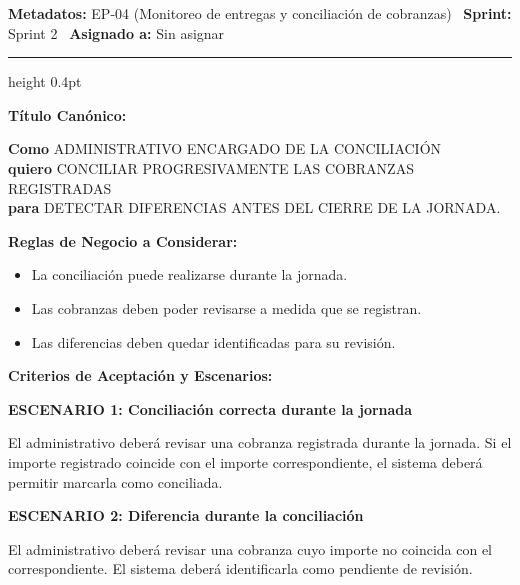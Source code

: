 \documentclass[a4paper,9pt]{article}
\begin{document}
\begin{tcolorbox}[hucard, title={\textbf{HU-20: CONCILIAR COBRANZAS DURANTE LA JORNADA} \hfill \scriptsize \colorbox{redstatus}{\textbf{\ Rejected\ }} \quad \colorbox{white}{\textcolor{primarydark}{\textbf{\ 3 pts\ }}}}]
\vspace{-1pt}
\noindent\textbf{\footnotesize Metadatos:} EP-04 (Monitoreo de entregas y conciliación de cobranzas) \textbar\ \textbf{Sprint:} Sprint 2 \textbar\ \textbf{Asignado a:} Sin asignar\par\vspace{2pt}
\hrule height 0.4pt\par\vspace{3pt}
\noindent\textbf{\footnotesize Título Canónico:}\par\vspace{1pt}
{\small \textbf{Como} ADMINISTRATIVO ENCARGADO DE LA CONCILIACIÓN \\ \textbf{quiero} CONCILIAR PROGRESIVAMENTE LAS COBRANZAS REGISTRADAS \\ \textbf{para} DETECTAR DIFERENCIAS ANTES DEL CIERRE DE LA JORNADA.}\par\vspace{3pt}
\noindent\textbf{\footnotesize Reglas de Negocio a Considerar:}\par\vspace{1pt}
{\footnotesize
\begin{itemize}[leftmargin=12pt, nosep, itemsep=1.5pt, topsep=1pt]
\item La conciliación puede realizarse durante la jornada.
\item Las cobranzas deben poder revisarse a medida que se registran.
\item Las diferencias deben quedar identificadas para su revisión.
\end{itemize}
}\par\vspace{3pt}
\noindent\textbf{\footnotesize Criterios de Aceptación y Escenarios:}\par\vspace{2pt}
{\footnotesize
\noindent\textbf{\textcolor{secondarydark}{ESCENARIO 1:  Conciliación correcta durante la jornada}}\par\vspace{1pt}
El administrativo deberá revisar una cobranza registrada durante la jornada. Si el importe registrado coincide con el importe correspondiente, el sistema deberá permitir marcarla como conciliada.\par\vspace{2.5pt}
\noindent\textbf{\textcolor{secondarydark}{ESCENARIO 2:  Diferencia durante la conciliación}}\par\vspace{1pt}
El administrativo deberá revisar una cobranza cuyo importe no coincida con el correspondiente. El sistema deberá identificarla como pendiente de revisión.\par\vspace{2.5pt}
}\par
\end{tcolorbox}
\end{document}

